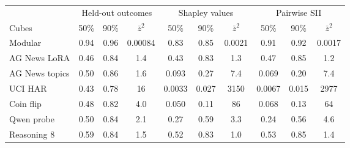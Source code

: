 \begin{tabular}{@{}lccccccccc@{}}
\toprule
& \multicolumn{3}{c}{Held-out outcomes} & \multicolumn{3}{c}{Shapley values} & \multicolumn{3}{c}{Pairwise SII} \\
\cmidrule(lr){2-4}\cmidrule(lr){5-7}\cmidrule(lr){8-10}
Cubes & 50\% & 90\% & $\bar z^2$ & 50\% & 90\% & $\bar z^2$ & 50\% & 90\% & $\bar z^2$ \\
\midrule
Modular & 0.94 & 0.96 & 0.00084 & 0.83 & 0.85 & 0.0021 & 0.91 & 0.92 & 0.0017 \\
AG News LoRA & 0.46 & 0.84 & 1.4 & 0.43 & 0.83 & 1.3 & 0.47 & 0.85 & 1.2 \\
AG News topics & 0.50 & 0.86 & 1.6 & 0.093 & 0.27 & 7.4 & 0.069 & 0.20 & 7.4 \\
UCI HAR & 0.43 & 0.78 & 16 & 0.0033 & 0.027 & 3150 & 0.0067 & 0.015 & 2977 \\
Coin flip & 0.48 & 0.82 & 4.0 & 0.050 & 0.11 & 86 & 0.068 & 0.13 & 64 \\
Qwen probe & 0.50 & 0.84 & 2.1 & 0.27 & 0.59 & 3.3 & 0.24 & 0.56 & 4.6 \\
Reasoning 8 & 0.59 & 0.84 & 1.5 & 0.52 & 0.83 & 1.0 & 0.53 & 0.85 & 1.4 \\
\bottomrule
\end{tabular}
